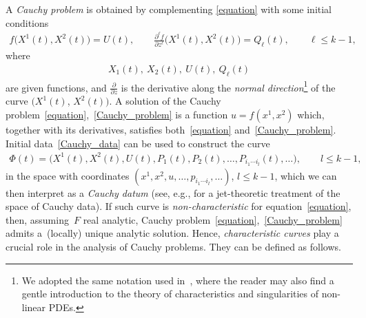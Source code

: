 \documentclass[pdftex]{sigma}
\numberwithin{equation}{section}
\begin{document}
A \emph{Cauchy problem} is obtained by complementing \eqref{equation} with some
 initial conditions
\begin{gather}\label{Cauchy_problem}
f \big(X^{1}(t),X^{2}(t)\big) =U(t),\qquad
\frac{\partial^\ell f}{\partial z^{\ell}} \big(X^{1}(t),X^{2}(t)\big) =Q_{\ell}(t), \qquad \ell\leq k-1,
\end{gather}
where
\begin{gather}\label{Cauchy_data}
 X_1(t), \ X_2(t),\ U(t),\ Q_\ell(t)
\end{gather}
 are given functions, and $\frac{\partial}{\partial z}$ is the derivative along the \emph{normal direction}\footnote{We adopted the same notation used in~\cite{LucaChar}, where the reader may also f\/ind a gentle introduction to the theory of characteristics and singularities of non-linear PDEs.} of the curve $(X^1(t)$, $X^2(t))$. A solution of the Cauchy problem~\eqref{equation},~\eqref{Cauchy_problem} is a function $u=f(x^1,x^2)$ which, together with its derivatives, satisf\/ies both~\eqref{equation} and~\eqref{Cauchy_problem}.
Initial data~\eqref{Cauchy_data} can be used to construct the curve
\begin{gather}\label{Cauchy_datum}
\Phi(t)=\big(X^{1}(t),X^{2}(t),U(t),P_{1}(t),P_{2}(t),\dots,P_{i_1\cdots i_{l}}(t),\dots\big),\qquad l\leq k-1,
\end{gather}
in the space with coordinates $(x^1,x^2,u,\dots,p_{i_1\cdots i_l},\dots)$, $l\leq k-1$, which we can then interpret as a \emph{Cauchy datum} (see, e.g., \cite{MorenoCauchy} for a jet-theoretic treatment of the space of Cauchy data). If such curve is \emph{non-characteristic} for equation~\eqref{equation}, then, assuming~$F$ real analytic, Cauchy problem~\eqref{equation},~\eqref{Cauchy_problem} admits a~(locally) unique analytic solution. Hence, \emph{characteristic curves} play a crucial role in the analysis of Cauchy problems. They can be def\/ined as follows.
\end{document}
